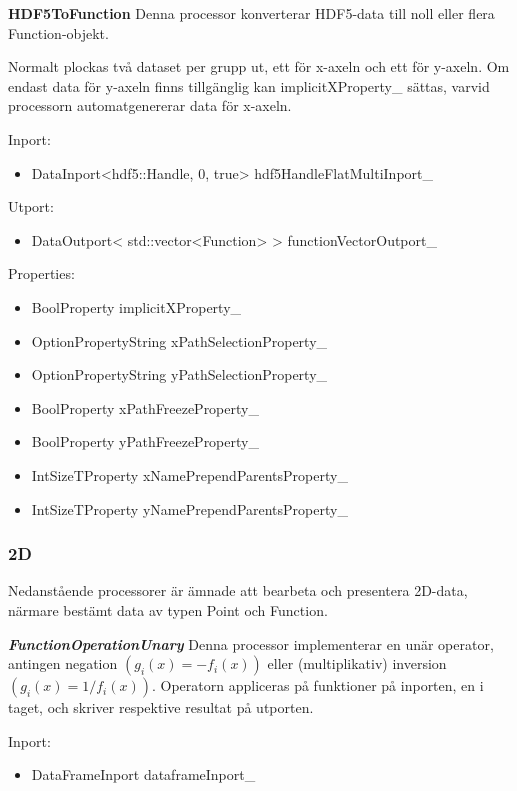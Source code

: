 \documentclass[a4paper,12pt]{article}
\begin{document}
\textbf{HDF5ToFunction}\newline
Denna processor konverterar HDF5-data till noll eller flera Function-objekt. 

Normalt plockas två dataset per grupp ut, ett för x-axeln och ett för y-axeln. Om endast data för y-axeln finns tillgänglig kan implicitXProperty\_ sättas, varvid processorn automatgenererar data för x-axeln.

Inport:
\begin{itemize}
\item DataInport<hdf5::Handle, 0, true> hdf5HandleFlatMultiInport\_
\end{itemize}

Utport:
\begin{itemize}
\item DataOutport< std::vector<Function> > functionVectorOutport\_
\end{itemize}

Properties:
\begin{itemize}
\item BoolProperty implicitXProperty\_
\item OptionPropertyString xPathSelectionProperty\_
\item OptionPropertyString yPathSelectionProperty\_
\item BoolProperty xPathFreezeProperty\_
\item BoolProperty yPathFreezeProperty\_
\item IntSizeTProperty xNamePrependParentsProperty\_
\item IntSizeTProperty yNamePrependParentsProperty\_
\end{itemize}

\subsubsection{2D}
\label{ch:2d-processorer}
Nedanstående processorer är ämnade att bearbeta och presentera 2D-data, närmare bestämt data av typen Point och Function.

\textbf{\textit{FunctionOperationUnary}}\newline
Denna processor implementerar en unär operator, antingen negation $(g_{i}(x) = -f_{i}(x))$ eller (multiplikativ) inversion $(g_{i}(x) = 1/f_{i}(x))$. Operatorn appliceras på funktioner på inporten, en i taget, och skriver respektive resultat på utporten.

Inport:
\begin{itemize}
\item DataFrameInport dataframeInport\_
\end{itemize}
\end{document}
